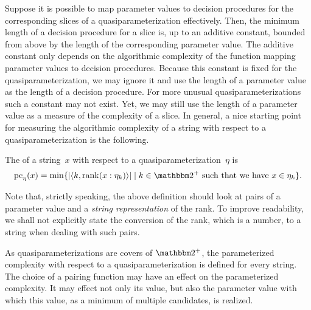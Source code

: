 Suppose it is possible to map parameter values to decision procedures for the corresponding slices of a quasiparameterization effectively.
Then, the minimum length of a decision procedure for a slice is, up to an additive constant, bounded from above by the length of the corresponding parameter value.
The additive constant only depends on the algorithmic complexity of the function mapping parameter values to decision procedures.
Because this constant is fixed for the quasiparameterization, we may ignore it and use the length of a parameter value as the length of a decision procedure.
For more unusual quasiparameterizations such a constant may not exist.
Yet, we may still use the length of a parameter value as a measure of the complexity of a slice.
In general, a nice starting point for measuring the algorithmic complexity of a string with respect to a quasiparameterization is the following.
\begin{definition}
  The  of a string~$x$ with respect to a quasiparameterization~$\eta$ is
  \begin{equation*}
    \pc_\eta(x) \deq \min\{\length{\pair{k}{\rank(x : \eta_k)}} \st k \in \binary^+\text{ such that we have $x \in \eta_k$}\}.
  \end{equation*}
\end{definition}

Note that, strictly speaking, the above definition should look at pairs of a parameter value and a \emph{string representation} of the rank.
To improve readability, we shall not explicitly state the conversion of the rank, which is a number, to a string when dealing with such pairs.

As quasiparameterizations are covers of $\binary^+$, the parameterized complexity with respect to a quasiparameterization is defined for every string.
The choice of a pairing function may have an effect on the parameterized complexity.
It may effect not only its value, but also the parameter value with which this value, as a minimum of multiple candidates, is realized.

